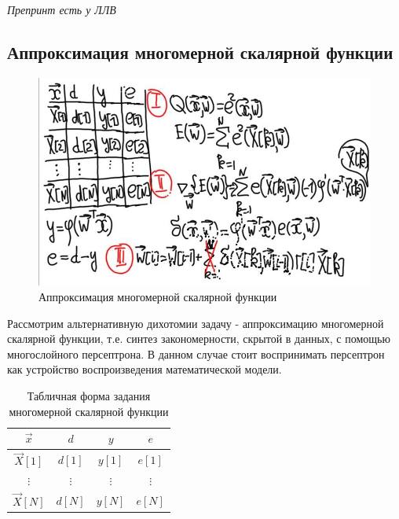 \documentclass{article}
\numberwithin{equation}{subsection}
\begin{document}
\begin{myquote}
    \textit{Препринт есть у ЛЛВ}
\end{myquote}




\subsection{Аппроксимация многомерной скалярной функции}

\begin{figure}[htbp]
    \centering
    \includegraphics[height=7cm]{hyperflat_9_1.jpeg}
    \caption{Аппроксимация многомерной скалярной функции}
    \label{hyperflat_9_1}
\end{figure}

Рассмотрим альтернативную дихотомии задачу - аппроксимацию многомерной скалярной функции,  т.е.
синтез закономерности, скрытой в данных, с помощью многослойного персептрона.
В данном случае стоит воспринимать персептрон как устройство воспроизведения математической модели.

\begin{table}[H]
    \centering
    \begin{tabular}{| c | c | c | c |}
        \hline
        $\vec{x}$ & $d$ & $y$ & $e$ \\
        \hline
        $\vec{X}[1]$ & $d[1]$ & $y[1]$ & $e[1]$ \\
        \hline
        $\vdots$ & $\vdots$ & $\vdots$ & $\vdots$ \\
        \hline
        $\vec{X}[N]$ & $d[N]$ & $y[N]$ & $e[N]$ \\
        \hline
    \end{tabular}
    \label{table:scalar-func-table}
    \caption{Табличная форма задания многомерной скалярной функции}
\end{table}
\end{document}
